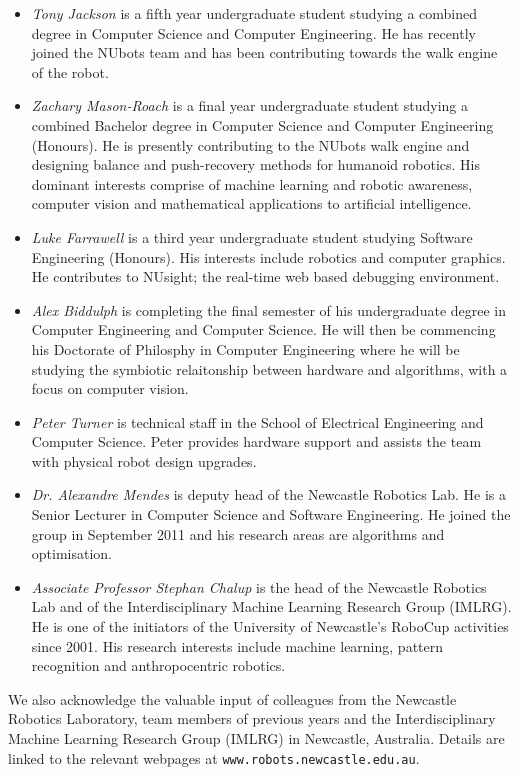 \documentclass{llncs}
\begin{document}
\begin{itemize}
\item \emph{Tony Jackson} is a fifth year undergraduate student studying a combined degree in Computer Science and Computer Engineering. He has recently joined the NUbots team and has been contributing towards the walk engine of the robot. 

\item \emph{Zachary Mason-Roach} is a final year undergraduate student studying a combined Bachelor degree in Computer Science and Computer Engineering (Honours). He is presently contributing to the NUbots walk engine and designing balance and push-recovery methods for humanoid robotics.  His dominant interests comprise of machine learning and robotic awareness, computer vision and mathematical applications to artificial intelligence.

\item \emph{Luke Farrawell} is a third year undergraduate student studying Software Engineering (Honours). His interests include robotics and computer graphics. He contributes to NUsight; the real-time web based debugging environment.


\item \emph{Alex Biddulph} is completing the final semester of his undergraduate degree in Computer Engineering and Computer Science. He will then be commencing his Doctorate of Philosphy in Computer Engineering where he will be studying the symbiotic relaitonship between hardware and algorithms, with a focus on computer vision.

\item \emph{Peter Turner} is technical staff in the School of Electrical Engineering and Computer Science. Peter provides hardware support and assists the team with physical robot design upgrades. %

\item \emph{Dr. Alexandre Mendes} is deputy head of the Newcastle Robotics Lab. He is a Senior Lecturer in Computer Science and Software Engineering. He joined the group in September 2011 and his research areas are algorithms and optimisation.

\item \emph{Associate Professor Stephan Chalup} is the head of the Newcastle Robotics Lab and of the Interdisciplinary Machine Learning Research Group (IMLRG). He is one of the initiators of the University of Newcastle's RoboCup activities since 2001. His research interests include machine learning, pattern recognition and anthropocentric robotics.

\end{itemize}
We also acknowledge the valuable input of colleagues from the Newcastle Robotics Laboratory, team members of previous years
and the Interdisciplinary Machine Learning Research Group (IMLRG) in
Newcastle, Australia. Details are linked to the relevant webpages at
\texttt{www.robots.newcastle.edu.au}.
\end{document}
